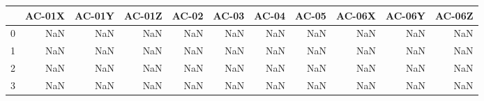 \begin{tabular}{lrrrrrrrrrr}
\toprule
{} &  AC-01X &  AC-01Y &  AC-01Z &  AC-02 &  AC-03 &  AC-04 &  AC-05 &  AC-06X &  AC-06Y &  AC-06Z \\
\midrule
0 &     NaN &     NaN &     NaN &    NaN &    NaN &    NaN &    NaN &     NaN &     NaN &     NaN \\
1 &     NaN &     NaN &     NaN &    NaN &    NaN &    NaN &    NaN &     NaN &     NaN &     NaN \\
2 &     NaN &     NaN &     NaN &    NaN &    NaN &    NaN &    NaN &     NaN &     NaN &     NaN \\
3 &     NaN &     NaN &     NaN &    NaN &    NaN &    NaN &    NaN &     NaN &     NaN &     NaN \\
\bottomrule
\end{tabular}

